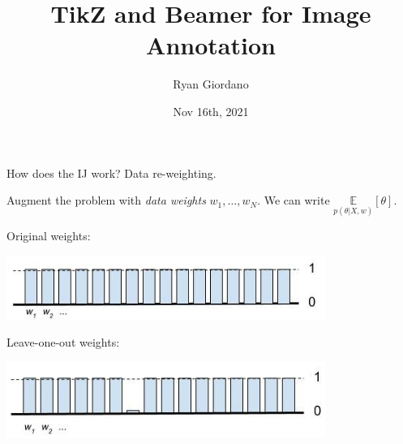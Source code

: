 \documentclass[8pt]{beamer}\usepackage[]{graphicx}\usepackage[]{color}
\title{TikZ and Beamer for Image Annotation}
\author{Ryan Giordano}
\date{Nov 16th, 2021}
\institute{Massachusetts Institute of Technology}
\def\expect#1#2{\underset{#1}{\mathbb{E}}\left[#2\right]}
\def\xvec{X}
\def\w{w}
\begin{document}

\begin{frame}{How does the IJ work?  Data re-weighting.}

Augment the problem with {\em data weights} $\w_1, \ldots, \w_N$.
%
We can write $\expect{p(\theta \vert \xvec, \w)}{\theta}$.

\begin{minipage}{0.49\textwidth}
    Original weights: \par
    \includegraphics[width=0.78\textwidth]{orig_weights}

    \par Leave-one-out weights: \par
    \includegraphics[width=0.78\textwidth]{weights_loo}


\end{minipage}
\end{frame}
\end{document}
